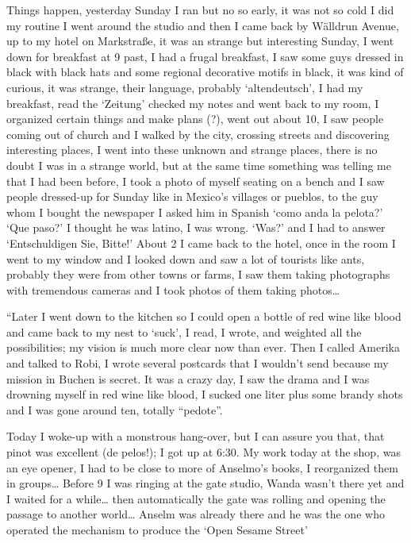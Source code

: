 \documentclass[smalldemyvopaper,11pt,twoside,onecolumn,openright,extrafontsizes]{memoir}
\begin{document}
Things happen, yesterday Sunday I ran but no so early, it was not so cold I did my routine I went around the studio and then I came back by Wälldrun Avenue, up to my hotel on Markstraße, it was an strange but interesting Sunday, I went down for breakfast at 9 past, I had a frugal breakfast, I saw some guys dressed in black with black hats and some regional decorative motifs in black, it was kind of curious, it was strange, their language, probably ‘altendeutsch’, I had my breakfast, read the ‘Zeitung’ checked my notes and went back to my room, I organized certain things and make plans (?), went out about 10, I saw people coming out of church and I walked by the city, crossing streets and discovering interesting places, I went into these unknown and strange places, there is no doubt I was in a strange world, but at the same time something was telling me that I had been before, I took a photo of myself seating on a bench and I saw people dressed-up for Sunday like in Mexico’s villages or pueblos, to the guy whom I bought the newspaper I asked him in Spanish ‘como anda la pelota?’ ‘Que paso?’ I thought he was latino, I was wrong. ‘Was?’ and I had to answer ‘Entschuldigen Sie, Bitte!’ About 2 I came back to the hotel, once in the room I went to  my window and I looked down and saw a lot of tourists like ants, probably they were from other towns or farms, I saw them taking photographs with tremendous cameras and I took photos of them taking photos… 

“Later I went down to the kitchen so I could open a bottle of red wine like blood and came back to my nest to ‘suck’, I read, I wrote, and weighted all the possibilities; my vision is much more clear now than ever. Then I called Amerika and talked to Robi, I wrote several postcards that I wouldn’t send because my mission in Buchen is secret. It was a crazy day, I saw the drama and I was drowning myself in red wine like blood, I sucked one liter plus some brandy shots and I was gone around ten, totally “pedote”.

Today I woke-up with a monstrous hang-over, but I can assure you that, that pinot was excellent (de pelos!); I got up at 6:30. My work today at the shop, was an eye opener, I had to be close to more of Anselmo’s books, I reorganized them in groups… Before 9 I was ringing at the gate studio, Wanda wasn’t there yet and I waited for a while… then automatically the gate was rolling and opening the passage to another world… Anselm was already there and he was the one who operated the mechanism to produce the ‘Open Sesame Street’
\end{document}
